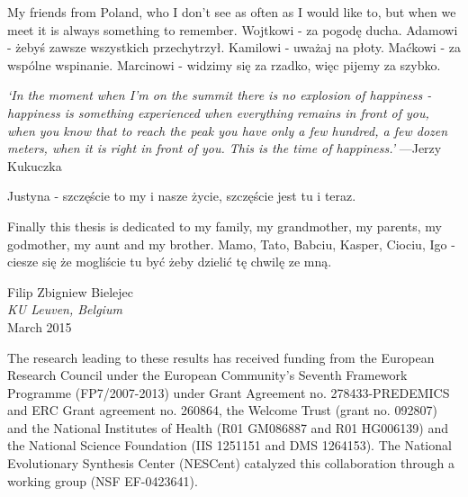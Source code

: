 My friends from Poland, who I don't see as often as I would like to, but when we meet it is always something to remember. 
Wojtkowi - za pogod\k{e} ducha. 
Adamowi - \.{z}eby\'{s} zawsze wszystkich przechytrzy\l{}.
Kamilowi - uwa\.{z}aj na p\l{}oty. 
Ma\'{c}kowi - za wsp\'{o}lne wspinanie.
Marcinowi - widzimy si\k{e} za rzadko, wi\k{e}c pijemy za szybko.

\emph{`In the moment when I'm on the summit there is no explosion of happiness - happiness is something experienced when everything remains in front of you, when you know that to reach the peak you have only a few hundred, a few dozen meters, when it is right in front of you. This is the time of happiness.'} 
---Jerzy Kukuczka 

Justyna - szcz\k{e}\'{s}cie to my i nasze \.{z}ycie, szcz\k{e}\'{s}cie jest tu i teraz. 

Finally this thesis is dedicated to my family, my grandmother, my parents, my godmother, my aunt and my brother. 
Mamo, Tato, Babciu, Kasper, Ciociu, Igo - ciesze si\k{e} \.{z}e mogli\'{s}cie tu by\'{c} \.{z}eby
dzieli\'{c} t\k{e} chwil\k{e} ze mn\k{a}. 

\begin{flushright}
Filip Zbigniew Bielejec \\
\textit{KU Leuven, Belgium} \\
March 2015
\par\end{flushright}

\vfill{}

The research leading to these results has received funding from the European Research Council under the European Community's Seventh Framework Programme (FP7/2007-2013) under Grant Agreement no. 278433-PREDEMICS and ERC Grant agreement no. 260864, the Welcome Trust (grant no. 092807) and the National Institutes of Health (R01 GM086887 and R01 HG006139) and the National Science Foundation (IIS 1251151 and DMS 1264153).
The National Evolutionary Synthesis Center (NESCent) catalyzed this collaboration through a working group (NSF EF-0423641).
